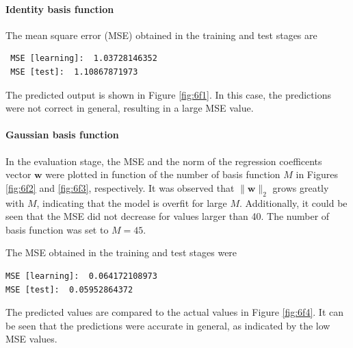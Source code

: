 \documentclass[a4paper,12pt]{article}
\newcommand{\mb}[1]{\ensuremath{\mathbf{#1}}}
\begin{document}
\paragraph{Identity basis function} The mean square error (MSE) obtained in the training and test stages are
\begin{verbatim}
 MSE [learning]:  1.03728146352
 MSE [test]:  1.10867871973
\end{verbatim}
The predicted output is shown in Figure \ref{fig:6f1}. In this case, the predictions were not correct in general, resulting in a large MSE value.

\paragraph{Gaussian basis function} In the evaluation stage, the MSE and the norm of the regression coefficents vector $\mb{w}$ were plotted in function of the number of basis function $M$ in Figures \ref{fig:6f2} and \ref{fig:6f3}, respectively. It was observed that $\|\mb{w}\|_2$ grows greatly with $M$, indicating that the model is overfit for large $M$. Additionally, it could be seen that the MSE did not decrease for values larger than 40. The number of basis function was set to $M=45$. 

The MSE obtained in the training and test stages were
\begin{verbatim}
MSE [learning]:  0.064172108973
MSE [test]:  0.05952864372
\end{verbatim}
The predicted values are compared to the actual values in Figure \ref{fig:6f4}. It can be seen that the predictions were accurate in general, as indicated by the low MSE values.
\end{document}
